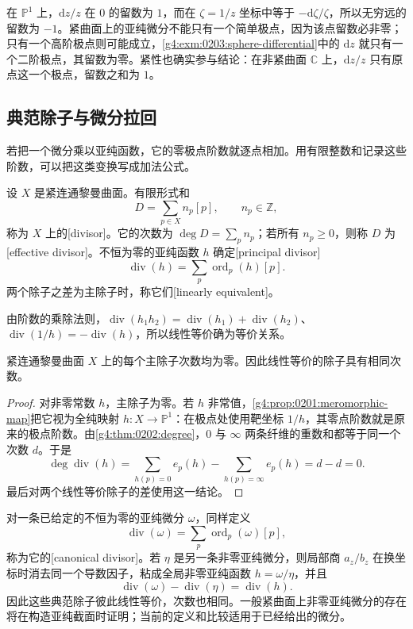 在 \(\mathbb P^1\) 上，\(\mathrm{d}z/z\) 在 \(0\) 的留数为 \(1\)，而在 \(\zeta=1/z\) 坐标中等于 \(-\mathrm{d}\zeta/\zeta\)，所以无穷远的留数为 \(-1\)。紧曲面上的亚纯微分不能只有一个简单极点，因为该点留数必非零；只有一个高阶极点则可能成立，\cref{g4:exm:0203:sphere-differential}中的 \(\mathrm{d}z\) 就只有一个二阶极点，其留数为零。紧性也确实参与结论：在非紧曲面 \(\mathbb C\) 上，\(\mathrm{d}z/z\) 只有原点这一个极点，留数之和为 \(1\)。

\subsection{典范除子与微分拉回}
\label{g4:subsec:0203:03}
若把一个微分乘以亚纯函数，它的零极点阶数就逐点相加。用有限整数和记录这些阶数，可以把这类变换写成加法公式。

\begin{definition}
	\label{g4:def:0203:divisor}
	设 \(X\) 是紧连通黎曼曲面。有限形式和
	\[
		D=\sum_{p\in X}n_p[p],\qquad n_p\in\mathbb Z,
	\]
	称为 \(X\) 上的[divisor]。它的次数为 \(\deg D=\sum_p n_p\)；若所有 \(n_p\ge0\)，则称 \(D\) 为[effective divisor]。不恒为零的亚纯函数 \(h\) 确定[principal divisor]
	\[
		\operatorname{div}(h)=\sum_p\operatorname{ord}_p(h)[p].
	\]
	两个除子之差为主除子时，称它们[linearly equivalent]。
\end{definition}

由阶数的乘除法则，\(\operatorname{div}(h_1h_2)=\operatorname{div}(h_1)+\operatorname{div}(h_2)\)、\(\operatorname{div}(1/h)=-\operatorname{div}(h)\)，所以线性等价确为等价关系。

\begin{proposition}
	\label{g4:prop:0203:principal-degree}
	紧连通黎曼曲面 \(X\) 上的每个主除子次数均为零。因此线性等价的除子具有相同次数。
\end{proposition}

\begin{proof}
	对非零常数 \(h\)，主除子为零。若 \(h\) 非常值，\cref{g4:prop:0201:meromorphic-map}把它视为全纯映射 \(h:X\rightarrow\mathbb P^1\)：在极点处使用靶坐标 \(1/h\)，其零点阶数就是原来的极点阶数。由\cref{g4:thm:0202:degree}，\(0\) 与 \(\infty\) 两条纤维的重数和都等于同一个次数 \(d\)。于是
	\[
		\deg\operatorname{div}(h)
		=\sum_{h(p)=0}e_p(h)-\sum_{h(p)=\infty}e_p(h)
		=d-d=0.
	\]
	最后对两个线性等价除子的差使用这一结论。
\end{proof}

对一条已给定的不恒为零的亚纯微分 \(\omega\)，同样定义
\[
	\operatorname{div}(\omega)=\sum_p\operatorname{ord}_p(\omega)[p],
\]
称为它的[canonical divisor]。若 \(\eta\) 是另一条非零亚纯微分，则局部商 \(a_z/b_z\) 在换坐标时消去同一个导数因子，粘成全局非零亚纯函数 \(h=\omega/\eta\)，并且
\begin{equation}
	\label{g4:eq:0203:canonical-linear-equivalence}
	\operatorname{div}(\omega)-\operatorname{div}(\eta)
	=\operatorname{div}(h).
\end{equation}
因此这些典范除子彼此线性等价，次数也相同。一般紧曲面上非零亚纯微分的存在将在构造亚纯截面时证明；当前的定义和比较适用于已经给出的微分。

